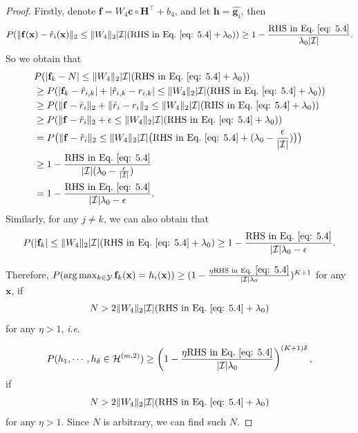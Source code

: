 \documentclass[10pt,a4paper]{amsart}
\begin{document}
\begin{proof}
    Firstly, denote $\mathbf{f} = W_4\mathbf{c} \circ \mathbf{H}^{\top}+b_4$, and let $\mathbf{h}=\hat{\mathbf{g}_i}$, then
    \begin{equation}
        P(\|\mathbf{f}(\mathbf{x})-\hat{r}_i (\mathbf{x})\|_2\leq\|W_4\|_2|\mathcal{I}|(\text{RHS~in~Eq.}~\eqref{eq: 5.4}+\lambda_0))\geq 1 - \frac{\text{RHS~in~Eq.}~\eqref{eq: 5.4}}{\lambda_0|\mathcal{I}|}.
    \end{equation}
    So we obtain that    
    \begin{equation}
    \begin{aligned}
        &P(|\mathbf{f}_k - N|\leq\|W_4\|_2|\mathcal{I}|(\text{RHS~in~Eq.}~\eqref{eq: 5.4}+\lambda_0)) \\
        &\geq P(|\mathbf{f}_k-\hat{r}_{i,k}|+|\hat{r}_{i,k}-r_{i,k}|\leq\|W_4\|_2|\mathcal{I}|(\text{RHS~in~Eq.}~\eqref{eq: 5.4}+\lambda_0)) \\
        &\geq P(\|\mathbf{f}-\hat{r}_i\|_2+\|\hat{r}_i-r_i\|_2\leq\|W_4\|_2|\mathcal{I}|(\text{RHS~in~Eq.}~\eqref{eq: 5.4}+\lambda_0)) \\
        &\geq P(\|\mathbf{f}-\hat{r}_i\|_2+\epsilon \leq\|W_4\|_2|\mathcal{I}|(\text{RHS~in~Eq.}~\eqref{eq: 5.4}+\lambda_0)) \\
        &=P\bigr(\|\mathbf{f}-\hat{r}_i\|_2 \leq\|W_4\|_2|\mathcal{I}|\bigl(\text{RHS~in~Eq.}~\eqref{eq: 5.4}+(\lambda_0-\frac{\epsilon}{|\mathcal{I}|})\bigr)\bigr) \\
        &\geq 1-\frac{\text{RHS~in~Eq.}~\eqref{eq: 5.4}}{|\mathcal{I}|(\lambda_0-\frac{\epsilon}{|\mathcal{I}|})}\\
        &= 1-\frac{\text{RHS~in~Eq.}~\eqref{eq: 5.4}}{|\mathcal{I}|\lambda_0-\epsilon}.
    \end{aligned}
    \end{equation}
    Similarly, for any $j \neq k$, we can also obtain that
    \begin{equation}
        P(|\mathbf{f}_k|\leq\|W_4\|_2|\mathcal{I}|(\text{RHS~in~Eq.}~\eqref{eq: 5.4}+\lambda_0)\geq 1-\frac{\text{RHS~in~Eq.}~\eqref{eq: 5.4}}{|\mathcal{I}|\lambda_0-\epsilon}.
    \end{equation}
    
    Therefore, $P(\arg\max_{k\in \mathcal{Y}}\mathbf{f}_k(\mathbf{x}) = h_i(\mathbf{x}))\geq (1-\frac{\eta \text{RHS~in~Eq.}~\eqref{eq: 5.4}}{|\mathcal{I}|\lambda_0})^{K+1}$ for any $\mathbf{x}$, 
    if 
    \begin{equation}
        N>2\|W_4\|_2|\mathcal{I}|(\text{RHS~in~Eq.}~\eqref{eq: 5.4}+\lambda_0)
    \end{equation}
    for any $\eta>1$, \textit{i}.\textit{e}.
    
    \begin{equation}
        P(h_1,\cdots,h_{\delta}\in \mathcal{H}^{(m,2)})\geq \left(1-\frac{\eta \text{RHS~in~Eq.}~\eqref{eq: 5.4}}{|\mathcal{I}|\lambda_0}\right)^{(K+1)\delta},
    \end{equation} 
    if
   \begin{equation}
        N>2\|W_4\|_2|\mathcal{I}|(\text{RHS~in~Eq.}~\eqref{eq: 5.4}+\lambda_0)
    \end{equation}
    for any $\eta>1$.
    Since $N$ is arbitrary, we can find such $N$.
\end{proof}
\end{document}
